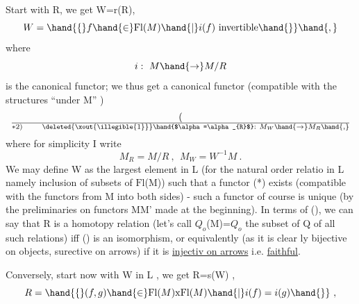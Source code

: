 Start with R, we get W=r(R),
\[ W = \hand{\{} f \hand{\in} \mathrm{Fl}(M) \hand{\mid} i(f) \text{ invertible}\hand{\}} \hand{,} \]
where
\[ i:\ M \hand{\to} M/R \]
is the canonical functor;  we thus get a canonical functor (compatible
with the structures ``under M'' )
\[ (\over{*}{2}) \qquad \deleted{\xout{\illegible{1}}}\hand{$\alpha=\alpha_{R}$}:\ M_W \hand{\to} M_R \hand{,} \]
where for simplicity I write
\[ M_R = M/R \ ,\ \ M_W = W^{-1}M \ . \]
We may define W as the largest element in L (for the natural order relatio
in L namely inclusion of subsets of $\mathrm{Fl}$(M))  such that a functor (*)
exists (compatible with the functors from M into both sides)  -  such a
functor of course is unique (by the preliminaries on functors M\hand{$\to$}M' made
at the beginning).   In terms of (),  we can say that R is  a homotopy
relation  (let's call $Q_o$(M)=$Q_o$ the  subset of Q of all such
relations)  iff \deleted{(*} () is an isomorphism, or equivalently (as it is clear
ly bijective on  objects,  surective on arrows)  if it is \uline{injectiv
on arrows}\hand{,} i.e. \uline{faithful}.

Conversely,  start now with W in L ,  we get R=s(W) ,
\[ R = \hand{\{}(f,g)\hand{\in} \mathrm{Fl}(M)\mathrm{x}\mathrm{Fl}(M) \hand{\mid} i(f)=i(g)\hand{\}} \ , \]
